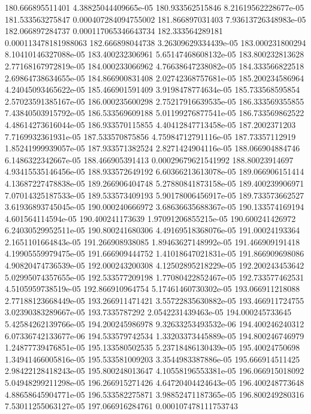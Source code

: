 {180.666895511401 4.38825044409665e-05
180.933562515846 8.21619562228677e-05
181.533563275847 0.000407284094755002
181.866897031403 7.93613726348983e-05
182.066897284737 0.000117065346643734
182.333564289181 0.000113478181988063
182.666898044738 3.26309629334439e-05
183.000231800294 8.10410146327088e-05
183.400232306961 5.65147468608132e-05
183.800232813628 2.77168167972819e-05
184.000233066962 4.76638647238082e-05
184.333566822518 2.69864738634655e-05
184.866900831408 2.02742368757681e-05
185.200234586964 4.24045093465622e-05
185.466901591409 3.9198478774634e-05
185.733568595854 2.57023591385167e-05
186.000235600298 2.75217916639535e-05
186.333569355855 7.43840503915792e-05
186.533569609188 5.01199276877541e-05
186.733569862522 4.48614273616044e-05
186.933570115855 4.40412847713458e-05
187.2002371203 7.7169932361931e-05
187.533570875856 4.75984712791116e-05
187.73357112919 1.85241999939057e-05
187.933571382524 2.8271424904116e-05
188.066904884746 6.1486322342667e-05
188.466905391413 0.00029679621541992
188.80023914697 4.93415535146456e-05
188.933572649192 6.60366213613078e-05
189.066906151414 4.13687227478838e-05
189.266906404748 5.27880841873158e-05
189.400239906971 7.07014325187533e-05
189.533573409193 5.90178006456917e-05
189.733573662527 3.61936893745045e-05
190.000240666972 3.68636635688367e-05
190.133574169194 4.601564114594e-05
190.400241173639 1.97091206855215e-05
190.600241426972 6.24030529952511e-05
190.800241680306 4.49169518368076e-05
191.00024193364 2.1651101664843e-05
191.266908938085 1.89463627148992e-05
191.466909191418 4.19905559979475e-05
191.666909444752 1.41018647021831e-05
191.866909698086 4.90820474736539e-05
192.000243200308 4.12502895218229e-05
192.200243453642 5.02995074357655e-05
192.533577209198 1.77080422852467e-05
192.733577462531 4.5105959738519e-05
192.866910964754 5.17461460730302e-05
193.066911218088 2.77188123668449e-05
193.266911471421 3.55722835630882e-05
193.466911724755 3.02390383289667e-05
193.7335787292 2.0542231439463e-05
194.000245733645 5.42584262139766e-05
194.200245986978 9.32633253493532e-06
194.400246240312 6.07336742133677e-06
194.533579742534 1.33203373445889e-05
194.800246746979 1.24877739476851e-05
195.133580502535 5.23718486130439e-05
195.40024750698 1.34941466005816e-05
195.533581009203 3.3544983387886e-05
195.666914511425 2.98422128418243e-05
195.800248013647 4.10558196553381e-05
196.066915018092 5.04948299211298e-05
196.266915271426 4.64720404424643e-05
196.400248773648 4.88658645904771e-05
196.533582275871 3.98852471187365e-05
196.800249280316 7.53011255063127e-05
197.066916284761 0.000107478111753743
}
